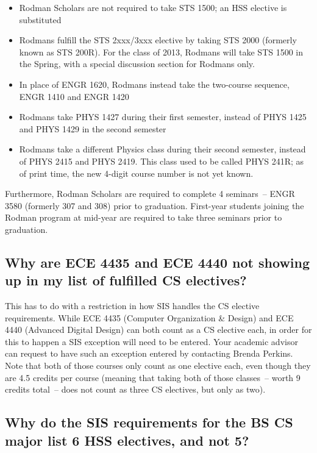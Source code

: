 \documentclass[10pt,letter]{book}
\newenvironment{itemlist}{
\begin{itemize}
\setlength{\itemsep}{0pt}
\setlength{\parskip}{0pt}}
{\end{itemize}}
\newcommand{\sisexceptionenterer}{Brenda Perkins}
\begin{document}
\begin{itemlist}
\item Rodman Scholars are not required to take STS 1500; an HSS
elective is substituted
\item Rodmans fulfill the STS 2xxx/3xxx elective by taking STS 2000
  (formerly known as STS 200R). For the class of 2013, Rodmans will
  take STS 1500 in the Spring, with a special discussion section for
  Rodmans only.
\item In place of ENGR 1620, Rodmans instead take the two-course
  sequence, ENGR 1410 and ENGR 1420
\item Rodmans take PHYS 1427 during their first semester,
  instead of PHYS 1425 and PHYS 1429 in the second
  semester
\item Rodmans take a different Physics class during their second
  semester, instead of PHYS 2415 and PHYS 2419. This
  class used to be called PHYS 241R; as of print time, the new 4-digit
  course number is not yet known.
\end{itemlist}

Furthermore, Rodman Scholars are required to complete 4 seminars~--
ENGR 3580 (formerly 307 and 308) prior to graduation. First-year
students joining the Rodman program at mid-year are required to take
three seminars prior to graduation.

\subsection{Why are ECE 4435 and ECE 4440 not showing up in my list of
  fulfilled CS electives?}
\label{sec:sisece4435issue}

This has to do with a restriction in how SIS handles the CS elective
requirements.  While ECE 4435 (Computer Organization \& Design)
and ECE 4440 (Advanced Digital Design) can both count as a CS
elective each, in order for this to happen a SIS exception will need
to be entered.  Your academic advisor can request to have such an
exception entered by contacting \sisexceptionenterer.  Note that both
of those courses only count as one elective each, even though they are
4.5 credits per course (meaning that taking both of those classes~--
worth 9 credits total~-- does not count as three CS electives, but
only as two).

\subsection{Why do the SIS requirements for the BS CS major list 6 HSS
  electives, and not 5?}
\label{sec:sishssissue}
\end{document}
